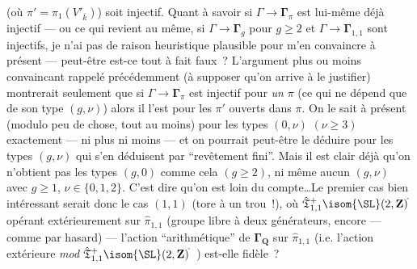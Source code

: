 (où $\pi'=\pi_1(V'_{\bar k})$) soit injectif. Quant à savoir si $\Gamma\to\boldsymbol{\Gamma}_{\pi}$ est lui-même déjà injectif --- ou ce qui revient au même, si $\Gamma\to \boldsymbol{\Gamma}_g$ pour $g\ge 2$ et $\Gamma\to\boldsymbol{\Gamma}_{1,1}$ sont injectifs, je n'ai pas de raison heuristique plausible pour m'en convaincre à présent --- peut-être est-ce tout à fait faux~?  L'argument plus ou moins convaincant rappelé précédemment (à supposer qu'on arrive à le justifier) montrerait seulement que si $\Gamma\to\boldsymbol{\Gamma}_\pi$ est injectif pour \emph{un} $\pi$ (ce qui ne dépend que de son type $(g,\nu)$) alors il l'est pour les $\pi'$ ouverts dans $\pi$. On le sait à présent (modulo peu de chose, tout au moins) pour les types $(0,\nu)$ $(\nu\ge 3)$ exactement --- ni plus ni moins --- et on pourrait peut-être le déduire pour les types $(g,\nu)$ qui s'en déduisent par ``revêtement fini''. Mais il est clair déjà qu'on n'obtient pas les types $(g,0)$ comme cela $(g\ge 2)$, ni même aucun $(g,\nu)$ avec $g\ge 1$, $\nu\in\{0,1,2\}$. C'est dire qu'on est loin du compte\dots Le premier cas bien intéressant serait donc le cas $(1,1)$ (tore à un trou~!), où $\hat{\mathfrak{T}}^+_{1,1} \isom {\SL}(2,{\mathbf{Z}})^{\hat{}}$ opérant extérieurement sur $\hat\pi_{1,1}$ (groupe libre à deux générateurs, encore --- comme par hasard) --- l'action ``arithmétique'' de $\boldsymbol{\Gamma}_{\mathbf{Q}}$ sur $\hat\pi_{1,1}$ (i.e. l'action extérieure \emph{mod} $\hat{\mathfrak{T}}^+_{1,1} \isom {\SL}(2,{\mathbf{Z}})^{\hat{}}$\ ) est-elle fidèle~?


